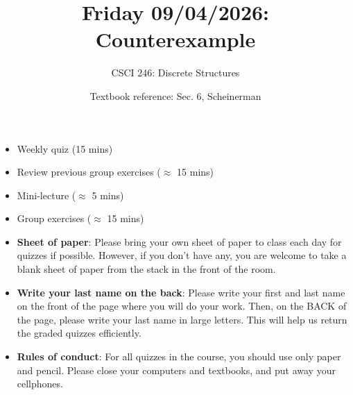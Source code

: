 \documentclass[10pt]{beamer}
\begin{document}






\title{Friday 09/04/2026: Counterexample}
\author{CSCI 246: Discrete Structures}
\date{Textbook reference: Sec. 6, Scheinerman}

\begin{frame}
    \titlepage 
\end{frame}


\begin{frame}
\small 


\begin{myyellowbox}[title=Today's Agenda]
\begin{itemize}
	\item Weekly quiz (15 mins)
	\item Review previous group exercises ($\approx$ 15 mins)
	\item Mini-lecture ($\approx$ 5 mins)
	\item Group exercises ($\approx$ 15 mins)	
\end{itemize}
\end{myyellowbox}


\begin{mygreenbox}[title=Quiz Set up]
\begin{itemize}
\item \textbf{Sheet of paper}: Please bring your own sheet of paper to class each day for quizzes if possible. However, if you don't have any, you are welcome to take a blank sheet of paper from the stack in the front of the room.
\item \textbf{Write your last name on the back}: Please write your first and last name on the front of the page where you will do your work.  Then, on the BACK of the page, please write your last name in large letters. This will help us return the graded quizzes efficiently.
\item \textbf{Rules of conduct}: For all quizzes in the course, you should use only paper and pencil.  Please close your computers and textbooks, and put away your cellphones.     
\end{itemize}
\end{mygreenbox}




\end{frame}
\end{document}
